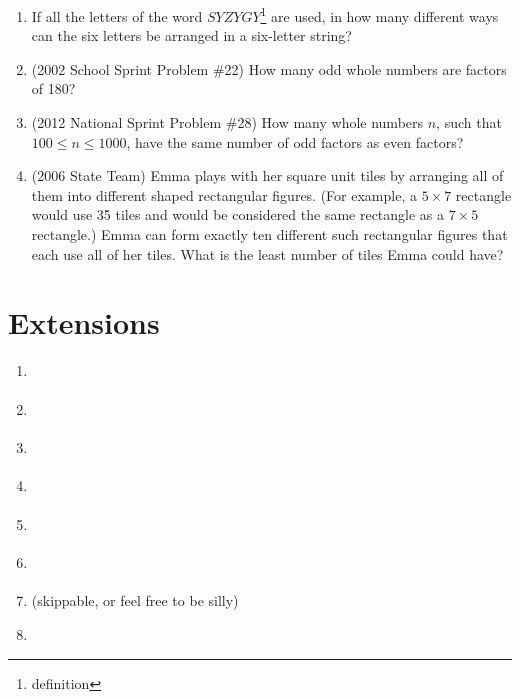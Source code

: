 \documentclass{article}
\begin{document}
\begin{enumerate}
\item If all the letters of the word $SYZYGY$\footnote{definition} are used, in how many different ways can the six letters be arranged in a six-letter string?\vspace{3cm}
\item (2002 School Sprint Problem \#22) How many odd whole numbers are factors of 180?\vspace{2cm}
\item (2012 National Sprint Problem \#28) How many whole numbers $n$, such that $100\leq n\leq 1000$, have the same number of odd factors as even factors?\vspace{2cm}
\item (2006 State Team) Emma plays with her square unit tiles by arranging all of them into different shaped rectangular figures. (For example, a $5\times 7$ rectangle would use 35 tiles and would be considered the same rectangle as a $7\times 5$ rectangle.) Emma can form exactly ten different such rectangular figures that each use all of her tiles. What is the least number of tiles Emma could have?\vspace{2cm}
\end{enumerate}


\newpage

\section*{Extensions}
\vspace{1cm}
\begin{enumerate}
\item \underline{\hspace{3in}}\vspace{1cm}
\item \underline{\hspace{3in}}\vspace{1cm}
\item \underline{\hspace{3in}}\vspace{1cm}
\item \underline{\hspace{3in}}\vspace{1cm}
\item \underline{\hspace{3in}}\vspace{1cm}
\item \underline{\hspace{3in}}\vspace{1cm}
\item \underline{\hspace{3in}} (skippable, or feel free to be silly)\vspace{1cm}
\item \underline{\hspace{3in}}
\end{enumerate}
\end{document}
